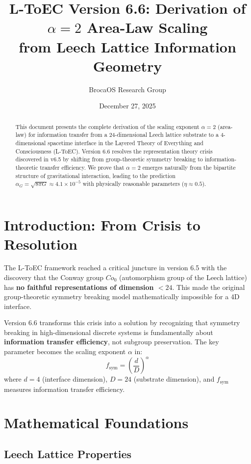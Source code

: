 \documentclass[11pt]{article}
\title{L-ToEC Version 6.6: Derivation of $\alpha=2$ Area-Law Scaling\\ from Leech Lattice Information Geometry}
\author{BrocaOS Research Group}
\date{December 27, 2025}
\begin{document}
\maketitle

\begin{abstract}
This document presents the complete derivation of the scaling exponent $\alpha=2$ (area-law) for information transfer from a 24-dimensional Leech lattice substrate to a 4-dimensional spacetime interface in the Layered Theory of Everything and Consciousness (L-ToEC). Version 6.6 resolves the representation theory crisis discovered in v6.5 by shifting from group-theoretic symmetry breaking to information-theoretic transfer efficiency. We prove that $\alpha=2$ emerges naturally from the bipartite structure of gravitational interaction, leading to the prediction $\alpha_G = \sqrt{8\pi G} \approx 4.1\times10^{-5}$ with physically reasonable parameters ($\eta \approx 0.5$).
\end{abstract}

\tableofcontents

\section{Introduction: From Crisis to Resolution}

The L-ToEC framework reached a critical juncture in version 6.5 with the discovery that the Conway group $Co_0$ (automorphism group of the Leech lattice) has \textbf{no faithful representations of dimension $<24$}. This made the original group-theoretic symmetry breaking model mathematically impossible for a 4D interface.

Version 6.6 transforms this crisis into a solution by recognizing that symmetry breaking in high-dimensional discrete systems is fundamentally about \textbf{information transfer efficiency}, not subgroup preservation. The key parameter becomes the scaling exponent $\alpha$ in:
\[
f_{\text{sym}} = \left(\frac{d}{D}\right)^\alpha
\]
where $d=4$ (interface dimension), $D=24$ (substrate dimension), and $f_{\text{sym}}$ measures information transfer efficiency.

\section{Mathematical Foundations}

\subsection{Leech Lattice Properties}
\end{document}
